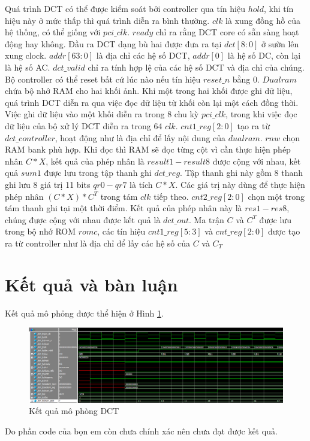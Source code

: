 \documentclass[conference]{IEEEtran}
\begin{document}
	Quá trình DCT có thể được kiểm soát bởi controller qua tín hiệu $hold$, khi tín hiệu này ở mức thấp thì quá trình diễn ra bình thường. $clk$ là xung đồng hồ của hệ thống, có thể giống với $pci\_clk$. $ready$ chỉ ra rằng DCT core có sẵn sàng hoạt động hay không. Đầu ra DCT dạng bù hai được đưa ra tại $dct[8:0]$ ở sườn lên xung clock. $addr[63:0]$ là địa chỉ các hệ số DCT, $addr[0]$ là hệ số DC, còn lại là hệ số AC. $dct\_valid$ chỉ ra tính hợp lệ của các hệ số DCT và địa chỉ của chúng. Bộ controller có thể reset bất cứ lúc nào nếu tín hiệu $reset\_n$ bằng 0. $Dualram$ chứa bộ nhớ RAM cho hai khối ảnh. Khi một trong hai khối được ghi dữ liệu, quá trình DCT diễn ra qua việc đọc dữ liệu từ khối còn lại một cách đồng thời. Việc ghi dữ liệu vào một khối diễn ra trong 8 chu kỳ $pci\_clk$, trong khi việc đọc dữ liệu của bộ xử lý DCT diễn ra trong 64 $clk$. $cnt1\_reg [2:0]$ tạo ra từ $dct\_controller$, hoạt động như là địa chỉ để lấy nội dung của $dualram$. $rnw$ chọn RAM bank phù hợp. Khi đọc thì RAM sẽ đọc từng cột vì cần thực hiện phép nhân $C*X$, kết quả của phép nhân là $result1 - result8$ được cộng với nhau, kết quả $sum1$ được lưu trong tập thanh ghi $dct\_reg$. Tập thanh ghi này gồm 8 thanh ghi lưu 8 giá trị 11 bits $qr0 - qr7$ là tích $C*X$. Các giá trị này dùng để thực hiện phép nhân $(C*X)*C^T$ trong tám $clk$ tiếp theo. $cnt2\_reg [2:0]$ chọn một trong tám thanh ghi tại một thời điểm. Kết quả của phép nhân này là $res1 - res8$, chúng được cộng với nhau được kết quả là $dct\_out$. Ma trận $C$ và $C^T$ được lưu trong bộ nhớ ROM $romc$, các tín hiệu $cnt1\_reg[5:3]$ và $cnt\_reg[2:0]$ được tạo ra từ controller như là địa chỉ để lấy các hệ số của $C$ và $C_T$ 
	\section{Kết quả và bàn luận}
	Kết quả mô phỏng được thể hiện ở Hình \ref{res}.\\
	\begin{figure}[h]
		\includegraphics[width=\linewidth]{Figures/result.png}
		\caption{Kết quả mô phòng DCT} 
		\label{res}
	\end{figure}
	Do phần code của bọn em còn chưa chính xác nên chưa đạt được kết quả.
\end{document}
